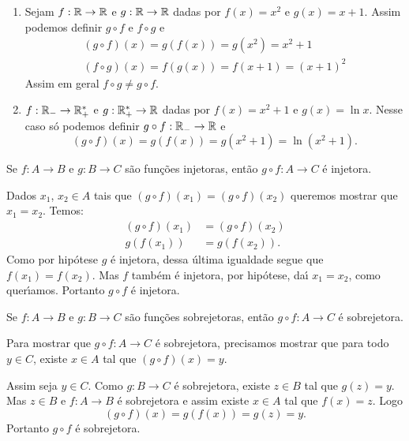 \begin{exemplos}
	\begin{enumerate}[label={\arabic*})]
		\item Sejam $f : \mathbb{R} \to \mathbb{R}$ e $g : \mathbb{R} \to \mathbb{R}$ dadas por $f(x) = x^2$ e $g(x) = x + 1$. Assim podemos definir $g \circ f$ e $f \circ g$ e
		\begin{align*}
			(g\circ f)(x) = g(f(x)) = g(x^2) = x^2 + 1\\
			(f\circ g)(x) = f(g(x)) = f(x + 1) = (x + 1)^2
		\end{align*}
		Assim em geral $f \circ g \ne g \circ f$.

		\item $f : \mathbb{R}_- \to \mathbb{R}^*_+$ e $g : \mathbb{R}^*_+ \to \mathbb{R}$ dadas por $f(x) = x^2 + 1$ e $g(x) = \ln x$. Nesse caso s\'o podemos definir $g \circ f : \mathbb{R}_- \to \mathbb{R}$ e
		\[
			(g\circ f)(x) = g(f(x)) = g(x^2 + 1) = \ln(x^2 + 1).
		\]
	\end{enumerate}
\end{exemplos}

\begin{proposicao}\label{composicao_funcoes_injetoras}
	Se $f : A \to B$ e $g : B \to C$ s{\~a}o fun{\c c}{\~o}es injetoras, ent{\~a}o $g\circ f : A \to C$ {\'e} injetora.
\end{proposicao}
\begin{prova}
	Dados $x_1$, $x_2 \in A$ tais que $(g\circ f)(x_1) = (g\circ f)(x_2)$ queremos mostrar que $x_1 = x_2$. Temos:
	\begin{align*}
		(g\circ f)(x_1) &= (g\circ f)(x_2)\\
		g(f(x_1)) &= g(f(x_2)).
	\end{align*}
	Como por hip\'otese $g$ \'e injetora, dessa \'ultima igualdade segue que $f(x_1) = f(x_2)$. Mas $f$ tamb\'em \'e injetora, por hip\'otese, da{\'\i} $x_1 = x_2$, como quer{\'\i}amos. Portanto $g\circ f$ \'e injetora.
\end{prova}

\begin{proposicao}\label{composicao_funcoes_sobrejetoras}
	Se $f : A \to B$ e $g : B \to C$ s{\~a}o fun\c{c}\~oes sobrejetoras, ent{\~a}o $g\circ f : A \to C$ {\'e} sobrejetora.
\end{proposicao}
\begin{prova}
 	Para mostrar que $g \circ f : A \to C$ \'e sobrejetora, precisamos mostrar que para todo $y \in C$, existe $x \in A$ tal que $(g\circ f)(x) = y$.

 	Assim seja $y \in C$. Como $g : B \to C$ \'e sobrejetora, existe $z \in B$ tal que $g(z) = y$. Mas $z \in B$ e $f : A \to B$ \'e sobrejetora e assim existe $x \in A$ tal que $f(x) = z$. Logo
 	\[
 		(g\circ f)(x) = g(f(x)) = g(z) = y.
 	\]
 	Portanto $g \circ f$ \'e sobrejetora.
\end{prova}


